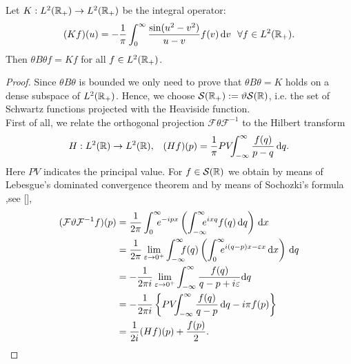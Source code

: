 \begin{prop}
	\label{prop:bracken_int}
	Let $K:L^2({\mathbb R}_+)\to L^2({\mathbb R}_+)$ be the integral operator:
	\begin{equation}
	\label{eq:bracken_int}
		(Kf)(u)=-\frac{1}{\pi}\int_{0}^{\infty}\frac{\sin(u^2-v^2)}{u-v}f(v)\, \mathrm d v \ \ \forall f\in L^2({\mathbb R}_+).
	\end{equation}
	Then $\theta B\theta f  = Kf$ for all $f\in L^2({\mathbb R}_+)$. 
\end{prop}
\begin{proof}
	Since $\theta B \theta$ is bounded we only need to prove that $\theta B\theta  = K$ holds on a dense subspace of $L^2({\mathbb R}_+)$. Hence, we choose $\mathcal{S}({\mathbb R}_+):=\vartheta\mathcal{S}({\mathbb R})$, i.e. the set of Schwartz functions projected with the Heaviside function.\\%
	First of all, we relate the orthogonal projection $\mathcal{F} \theta \mathcal{F}^{-1}$ to the Hilbert transform
	\begin{equation}
		\begin{aligned}
		& H:L^2({\mathbb R})\to L^2({\mathbb R}), & (Hf)(p)=\frac{1}{\pi}PV\!\!\!\int_{-\infty}^{\infty}\frac{f(q)}{p-q}\, \mathrm d q.
		\end{aligned}
	\end{equation} 
	Here $PV$ indicates the principal value. For $f\in\mathcal{S}({\mathbb R})$ we obtain by means of Lebesgue's dominated convergence theorem and by means of Sochozki's formula ,see [\citealp[Example 3.3.1]{blanch}],
	\begin{equation}
		\begin{aligned}
		(\mathcal{F} \theta \mathcal{F}^{-1}f)(p) &= \frac{1}{2\pi}\int_{0}^{\infty}\nspace\!e^{-ipx}\left(\int_{-\infty}^{\infty}\nspace\!e^{ixq}f(q)\, \dd q\right)\, \dd x\\
		&= \frac{1}{2\pi}\lim_{\varepsilon\to 0^+}\int_{-\infty}^{\infty}\nspace\!f(q)\left(\int_{0}^{\infty}\nspace\!e^{i(q-p)x-\varepsilon x}\, \dd x\right)\, \dd q\\
		&= -\frac{1}{2\pi i}\lim_{\varepsilon\to 0^+}\int_{-\infty}^{\infty}\frac{f(q)}{q-p+i\varepsilon}\dd q\\
		&= -\frac{1}{2\pi i}\left\{ PV\nspace\int_{-\infty}^{\infty}\frac{f(q)}{q-p}\, \dd q-i\pi f(p)\right\}\\
		&= \frac{1}{2i}(Hf)(p)+\frac{f(p)}{2}.
		\end{aligned}
	\end{equation}

\end{proof}
